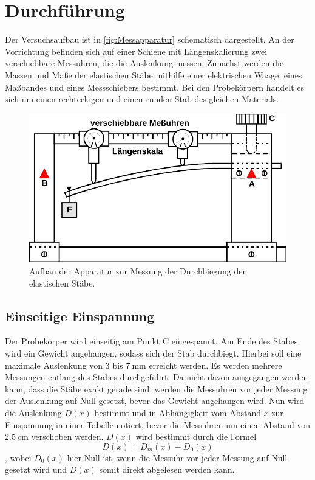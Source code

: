 \section{Durchführung}
\label{sec:Durchführung}

Der Versuchsaufbau ist in \autoref{fig:Messapparatur} schematisch dargestellt.
An der Vorrichtung befinden sich auf einer Schiene mit Längenskalierung zwei verschiebbare Messuhren, die die Auslenkung messen.
Zunächst werden die Massen und Maße der elastischen Stäbe mithilfe einer elektrischen Waage, eines Maßbandes und eines Messschiebers bestimmt.
Bei den Probekörpern handelt es sich um einen rechteckigen und einen runden Stab des gleichen Materials. 


\begin{figure}[H]
    \centering
    \includegraphics{content/Messapparat.pdf}
    \caption{Aufbau der Apparatur zur Messung der Durchbiegung der elastischen Stäbe.\cite[111]{V103}}
    \label{fig:Messapparatur}
\end{figure}

\subsection{Einseitige Einspannung}
Der Probekörper wird einseitig am Punkt C eingespannt. 
Am Ende des Stabes wird ein Gewicht angehangen, sodass sich der Stab durchbiegt. 
Hierbei soll eine maximale Auslenkung von $\num{3}$ bis $\qty{7}{\milli\meter}$ erreicht werden.
Es werden mehrere Messungen entlang des Stabes durchgeführt.
Da nicht davon ausgegangen werden kann, dass die Stäbe exakt gerade sind, werden die Messuhren vor jeder Messung der Auslenkung auf Null gesetzt,
bevor das Gewicht angehangen wird.
Nun wird die Auslenkung $D(x)$ bestimmt und in Abhängigkeit vom Abstand $x$ zur Einspannung in einer Tabelle notiert, 
bevor die Messuhren um einen Abstand von $\qty{2,5}{\centi\meter}$ verschoben werden.
$D(x)$ wird bestimmt durch die Formel
\begin{equation}
    D(x) = D_m(x) - D_0(x)
    \label{eqn:D(x)1}
\end{equation}
, wobei $D_0(x)$ hier Null ist, wenn die Messuhr vor jeder Messung auf Null gesetzt wird und $D(x)$ somit direkt abgelesen werden kann.

